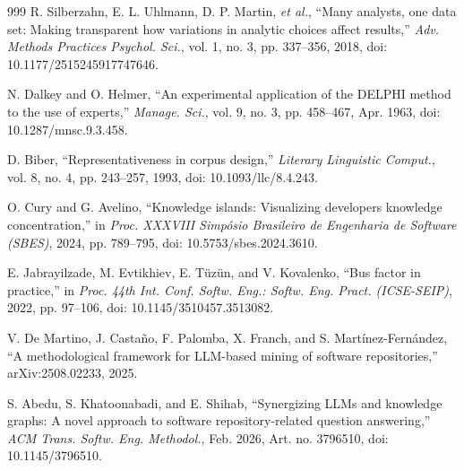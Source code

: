 \documentclass[preprints,article,submit,moreauthors]{Definitions/mdpi}
\begin{document}
{\begin{thebibliography}{999}
 R. Silberzahn, E. L. Uhlmann, D. P. Martin, \emph{et al.}, ``Many analysts, one data set: Making transparent how variations in analytic choices affect results,'' \emph{Adv. Methods Practices Psychol. Sci.}, vol. 1, no. 3, pp. 337--356, 2018, doi: 10.1177/2515245917747646.

 N. Dalkey and O. Helmer, ``An experimental application of the DELPHI method to the use of experts,'' \emph{Manage. Sci.}, vol. 9, no. 3, pp. 458--467, Apr. 1963, doi: 10.1287/mnsc.9.3.458.

 D. Biber, ``Representativeness in corpus design,'' \emph{Literary Linguistic Comput.}, vol. 8, no. 4, pp. 243--257, 1993, doi: 10.1093/llc/8.4.243.

 O. Cury and G. Avelino, ``Knowledge islands: Visualizing developers knowledge concentration,'' in \emph{Proc. XXXVIII Simp\'{o}sio Brasileiro de Engenharia de Software (SBES)}, 2024, pp. 789--795, doi: 10.5753/sbes.2024.3610.

 E. Jabrayilzade, M. Evtikhiev, E. T\"{u}z\"{u}n, and V. Kovalenko, ``Bus factor in practice,'' in \emph{Proc. 44th Int. Conf. Softw. Eng.: Softw. Eng. Pract. (ICSE-SEIP)}, 2022, pp. 97--106, doi: 10.1145/3510457.3513082.

 V. De Martino, J. Casta\~{n}o, F. Palomba, X. Franch, and S. Mart\'{i}nez-Fern\'{a}ndez, ``A methodological framework for LLM-based mining of software repositories,'' arXiv:2508.02233, 2025.

 S. Abedu, S. Khatoonabadi, and E. Shihab, ``Synergizing LLMs and knowledge graphs: A novel approach to software repository-related question answering,'' \emph{ACM Trans. Softw. Eng. Methodol.}, Feb. 2026, Art. no. 3796510, doi: 10.1145/3796510.

\end{thebibliography}
}
\end{document}
